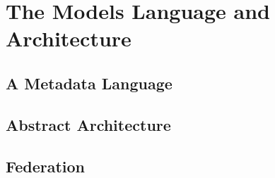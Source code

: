 \section{The Models Language and Architecture}

\subsection{A Metadata Language }

\subsection{Abstract Architecture}

\subsection{Federation}
